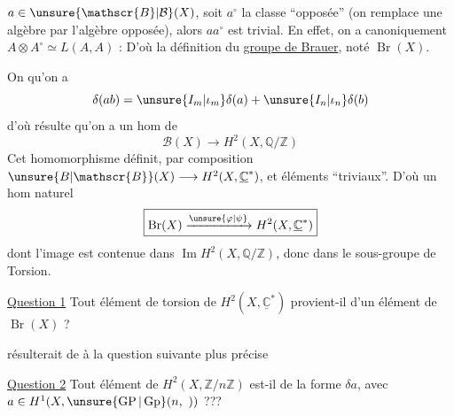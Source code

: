 $a\in\unsure{\mathscr{B}|\mathcal{B}}(X)$, soit $a^\circ$ la classe ``opposée'' (on remplace une algèbre par l'algèbre opposée), alors $aa^\circ$ est trivial. En effet, on a canoniquement $A\otimes A^\circ\simeq L(A,A)$ : D'où la définition du \uline{groupe de Brauer}, noté $\operatorname{Br}(X)$.

On  qu'on a
\[
\delta(ab)=\unsure{I_m|\iota_m}\delta(a)+\unsure{I_n|\iota_n}\delta(b)
\]
d'où résulte qu'on a un hom de  
\[
\mathscr{B}(X)\longrightarrow H^2(X,\mathbb{Q}/\mathbb{Z})
\]
Cet homomorphisme définit, par composition
$\unsure{B|\mathscr{B}}(X)\longrightarrow H^2(X,\underline{\mathbb{C}}^*)$,  et     éléments ``triviaux''.  D'où un hom naturel 
\[
\boxed{\operatorname{Br}(X)\xrightarrow{\unsure{\varphi|\psi}}H^2(X,\underline{\mathbb{C}}^*)}
\]
dont l'image est contenue dans $\operatorname{Im}H^2(X,\mathbb{Q}/\mathbb{Z})$, donc dans le sous-groupe de Torsion.

\uline{Question 1} Tout élément de torsion de $H^2(X,\underline{\mathbb{C}}^*)$ provient-il d'un élément de $\operatorname{Br}(X)$ ?

 résulterait de  à la question suivante plus précise

\uline{Question 2} Tout élément de $H^2(X,\mathbb{Z}/n\mathbb{Z})$ est-il de la forme $\delta a$, avec $a\in H^1(X,\unsure{\operatorname{GP}|\operatorname{Gp}}(n,\ ))$ ???

